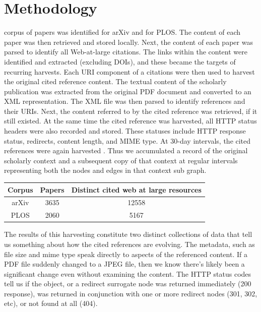 \documentclass[12pt]{article}
\begin{document}
\section{Methodology}
 corpus of papers was identified for arXiv and for PLOS. The content of each paper was then retrieved and stored locally. Next, the content of each paper was parsed to identify all Web-at-large citations. The links within the content were identified and extracted (excluding DOIs), and these became the targets of recurring harvests.  Each URI component of a citations were then used to harvest the original cited reference content. The textual content of the scholarly publication was extracted from the original PDF document and converted to an XML representation. The XML file was then parsed to identify references and their URIs. Next, the content referred to by the cited reference was retrieved, if it still existed. At the same time the cited reference was harvested, all HTTP status headers were also recorded and stored.  These statuses include HTTP response status, redirects, content length, and MIME type. At 30-day intervals, the cited references were again harvested . Thus we accumulated a record of the original scholarly context and a subsequent copy of that context at regular intervals representing both the nodes and edges in that context sub graph.
\begin{center}
 \begin{tabular}{||c|c|c||} 
 \hline
 Corpus & Papers & Distinct cited web at large resources \\ [0.5ex] 
 \hline\hline
 arXiv & 3635 & 12558 \\ 
 \hline
 PLOS & 2060 & 5167 \\
 \hline
 \hline
\end{tabular}
\end{center}
The results of this harvesting constitute two distinct collections of data that tell us something about how the cited references are evolving. The metadata, such as file size and mime type speak directly to aspects of the referenced content. If a PDF file suddenly changed to a JPEG file, then we know there's likely been a significant change even without examining the content. The HTTP status codes tell us if the object, or a redirect surrogate node was returned immediately (200 response), was returned in conjunction with one or more redirect nodes (301, 302, etc), or not found at all (404).
\end{document}
